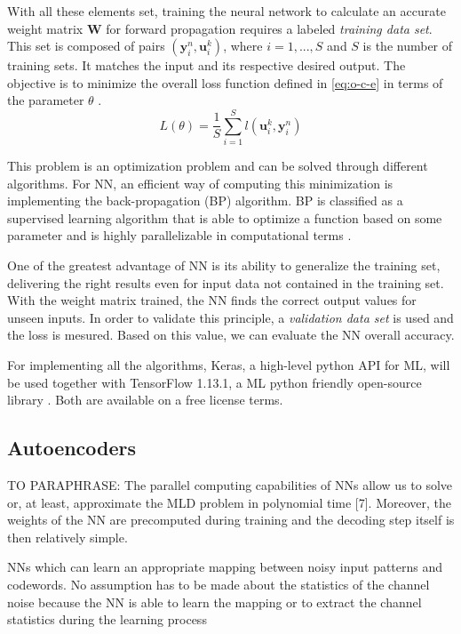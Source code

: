 \documentclass[conference]{IEEEtran}
\begin{document}
With all these elements set, training the neural network to calculate an accurate weight matrix $\textbf{W}$ for forward propagation requires a labeled \textit{training data set}. This set is composed of pairs $ (\textbf{y}_{i}^{n}, {\mathbf{u}}_i^k) $, where $i=1,...,S$ and $S$ is the number of training sets. It matches the input and its respective desired output. The objective is to minimize the overall loss function defined in \eqref{eq:o-c-e} in terms of the parameter $\theta$ \cite{b2}. 
\begin{equation}\label{eq:o-c-e}
L\left( \theta \right) =\dfrac {1}{S}\sum ^{S}_{i=1}l\left({\mathbf{u}}_i^k  , \textbf{y}_{i}^{n}\right)	
\end{equation}  

This problem is an optimization problem and can be solved through different algorithms. For NN, an efficient way of computing this minimization is implementing the back-propagation (BP) algorithm. 	BP is classified as a supervised learning algorithm that is able to optimize a function based on some parameter and is highly parallelizable in computational terms \cite{b9}\cite{b8}.

One of the greatest advantage of NN is its ability to generalize the training set, delivering the right results even for input data not contained in the training set. With the weight matrix trained, the NN finds the correct output values for unseen inputs. In order to validate this principle, a \textit{validation data set} is used and the loss is mesured. Based on this value, we can evaluate the NN overall accuracy.

For implementing all the algorithms, Keras, a high-level python API for ML, will be used together with TensorFlow 1.13.1, a ML python friendly open-source library \cite{b11} \cite{b12}. Both are available on a free license terms.




\subsection{Autoencoders}
TO PARAPHRASE: The parallel computing
capabilities of NNs allow us to solve or, at least, approximate
the MLD problem in polynomial time [7]. Moreover, the
weights of the NN are precomputed during training and the
decoding step itself is then relatively simple. 

NNs which can learn an appropriate
mapping between noisy input patterns and codewords. No
assumption has to be made about the statistics of the channel
noise because the NN is able to learn the mapping or to
extract the channel statistics during the learning process
\end{document}
